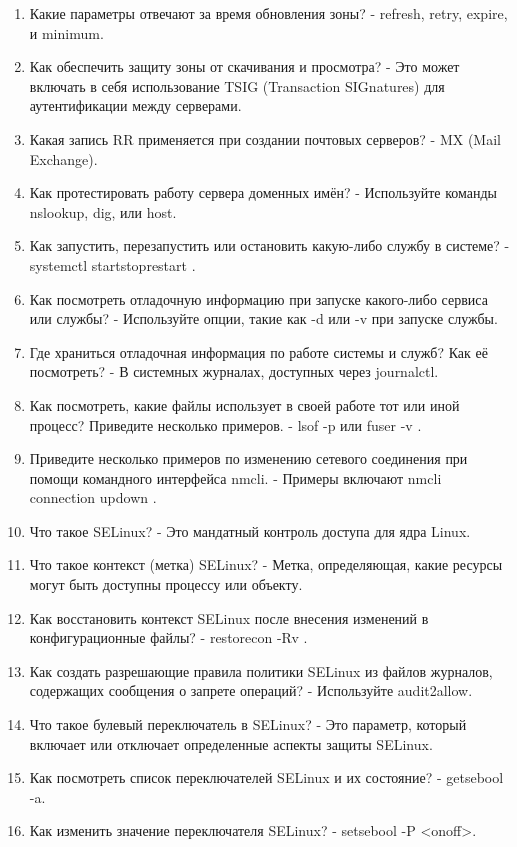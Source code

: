 \documentclass[
  12pt,
  a4paper,
  DIV=11,
  numbers=noendperiod]{scrreprt}
\begin{document}
\begin{enumerate}
\item
  Какие параметры отвечают за время обновления зоны? - refresh, retry,
  expire, и minimum.
\item
  Как обеспечить защиту зоны от скачивания и просмотра? - Это может
  включать в себя использование TSIG (Transaction SIGnatures) для
  аутентификации между серверами.
\item
  Какая запись RR применяется при создании почтовых серверов? - MX (Mail
  Exchange).
\item
  Как протестировать работу сервера доменных имён? - Используйте команды
  nslookup, dig, или host.
\item
  Как запустить, перезапустить или остановить какую-либо службу в
  системе? - systemctl start\textbar stop\textbar restart .
\item
  Как посмотреть отладочную информацию при запуске какого-либо сервиса
  или службы? - Используйте опции, такие как -d или -v при запуске
  службы.
\item
  Где храниться отладочная информация по работе системы и служб? Как её
  посмотреть? - В системных журналах, доступных через journalctl.
\item
  Как посмотреть, какие файлы использует в своей работе тот или иной
  процесс? Приведите несколько примеров. - lsof -p или fuser -v .
\item
  Приведите несколько примеров по изменению сетевого соединения при
  помощи командного интерфейса nmcli. - Примеры включают nmcli
  connection up\textbar down .
\item
  Что такое SELinux? - Это мандатный контроль доступа для ядра Linux.
\item
  Что такое контекст (метка) SELinux? - Метка, определяющая, какие
  ресурсы могут быть доступны процессу или объекту.
\item
  Как восстановить контекст SELinux после внесения изменений в
  конфигурационные файлы? - restorecon -Rv .
\item
  Как создать разрешающие правила политики SELinux из файлов журналов,
  содержащих сообщения о запрете операций? - Используйте audit2allow.
\item
  Что такое булевый переключатель в SELinux? - Это параметр, который
  включает или отключает определенные аспекты защиты SELinux.
\item
  Как посмотреть список переключателей SELinux и их состояние? -
  getsebool -a.
\item
  Как изменить значение переключателя SELinux? - setsebool -P
  \textless on\textbar off\textgreater.
\end{enumerate}
\end{document}

